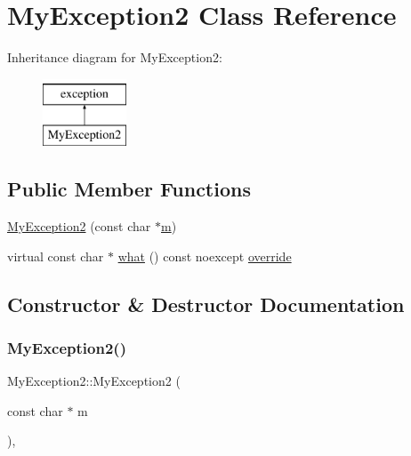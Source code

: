 \hypertarget{class_my_exception2}{}\section{My\+Exception2 Class Reference}
\label{class_my_exception2}
Inheritance diagram for My\+Exception2\+:\begin{figure}[H]
\begin{center}
\leavevmode
\includegraphics[height=2.000000cm]{class_my_exception2}
\end{center}
\end{figure}
\subsection*{Public Member Functions}
\begin{DoxyCompactItemize}
\item 
\mbox{\hyperlink{class_my_exception2_aaf4559b3dfb7b8d164708d92c3c57730}{My\+Exception2}} (const char $\ast$\mbox{\hyperlink{_s_d_l__opengl__glext_8h_af593500c283bf1a787a6f947f503a5c2}{m}})
\item 
virtual const char $\ast$ \mbox{\hyperlink{class_my_exception2_ad95b36834ea0385941bbd577dd3785d7}{what}} () const noexcept \mbox{\hyperlink{dictobject_8h_a055cf4fd16bde9bce026127362cee1a3}{override}}
\end{DoxyCompactItemize}


\subsection{Constructor \& Destructor Documentation}
\mbox{\label{class_my_exception2_aaf4559b3dfb7b8d164708d92c3c57730}} 
\subsubsection{\texorpdfstring{MyException2()}{MyException2()}}
{\footnotesize\ttfamily My\+Exception2\+::\+My\+Exception2 (\begin{DoxyParamCaption}\item[{const char $\ast$}]{m }\end{DoxyParamCaption})\hspace{0.3cm}{\ttfamily [inline]}, {\ttfamily [explicit]}}



